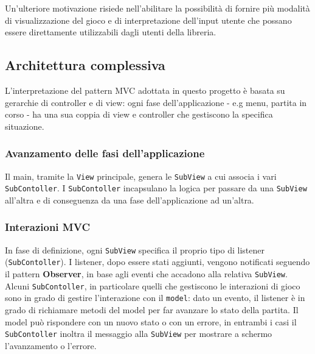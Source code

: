 Un'ulteriore motivazione risiede nell'abilitare la possibilità di fornire più modalità di visualizzazione del gioco e di interpretazione dell'input utente che possano essere direttamente utilizzabili dagli utenti della libreria. 

\subsection{Architettura complessiva}
L'interpretazione del pattern MVC adottata in questo progetto è basata su gerarchie di controller e di view: ogni fase dell'applicazione - e.g menu, partita in corso - ha una sua coppia di view e controller che gestiscono la specifica situazione.

\subsubsection{Avanzamento delle fasi dell'applicazione}
Il main, tramite la \texttt{View} principale, genera le \texttt{SubView} a cui associa i vari \texttt{SubContoller}.
I \texttt{SubContoller} incapsulano la logica per passare da una \texttt{SubView} all'altra e di conseguenza da una fase dell'applicazione ad un'altra.

\subsubsection{Interazioni MVC}
In fase di definizione, ogni \texttt{SubView} specifica il proprio tipo di listener (\texttt{SubContoller}).
%
I listener, dopo essere stati aggiunti, vengono notificati seguendo il pattern \textbf{Observer}, in base agli eventi che accadono alla relativa \texttt{SubView}.
Alcuni \texttt{SubContoller}, in particolare quelli che gestiscono le interazioni di gioco sono in grado di gestire l'interazione con il \texttt{model}: dato un evento, il listener è in grado di richiamare metodi del model per far avanzare lo stato della partita.
%
Il model può rispondere con un nuovo stato o con un errore, in entrambi i casi il \texttt{SubContoller} inoltra il messaggio alla \texttt{SubView} per mostrare a schermo l'avanzamento o l'errore.
